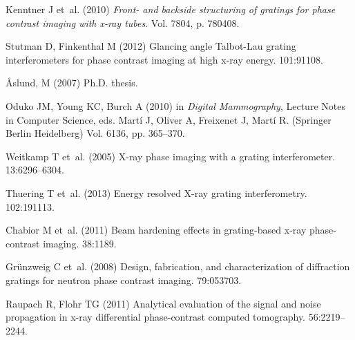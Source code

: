 \documentclass{pnastwo}
\begin{document}
\begin{article}
\begin{thebibliography}{10}
Kenntner J et~al. (2010) {\em {Front- and backside structuring of gratings for
  phase contrast imaging with x-ray tubes}}.
\newblock Vol.{} 7804, p. 780408.

Stutman D, Finkenthal M (2012) {Glancing angle Talbot-Lau grating
  interferometers for phase contrast imaging at high x-ray energy}.
 101:91108.

{\AA slund, M} (2007) Ph.D. thesis.

Oduko JM, Young KC, Burch A (2010) in {\em Digital Mammography}, Lecture Notes
  in Computer Science, eds.{} Martí J, Oliver A, Freixenet J, Martí R.
\newblock (Springer Berlin Heidelberg) Vol.{} 6136, pp. 365--370.

Weitkamp T et~al. (2005) {X-ray phase imaging with a grating interferometer}.
 13:6296--6304.

Thuering T et~al. (2013) {Energy resolved X-ray grating interferometry}.
 102:191113.

Chabior M et~al. (2011) {Beam hardening effects in grating-based x-ray
  phase-contrast imaging}.
 38:1189.

Gr\"{u}nzweig C et~al. (2008) {Design, fabrication, and characterization of
  diffraction gratings for neutron phase contrast imaging.}
 79:053703.

Raupach R, Flohr TG (2011) {Analytical evaluation of the signal and noise
  propagation in x-ray differential phase-contrast computed tomography.}
 56:2219--2244.

\end{thebibliography}

\end{article}


\end{document}
